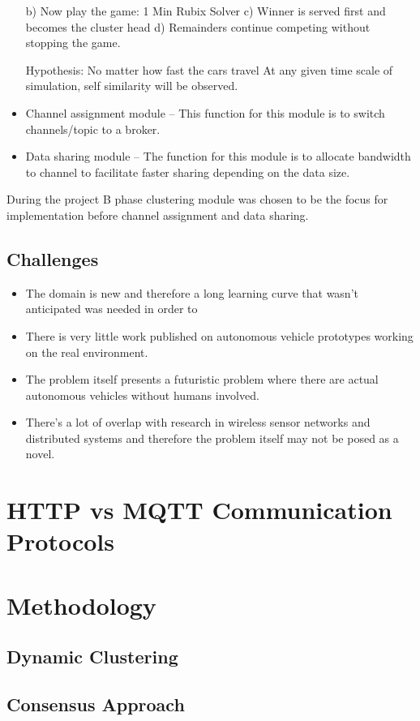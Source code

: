 \documentclass{article}
\begin{document}
\begin{itemize}
b) Now play the game: 1 Min Rubix Solver
c) Winner is served first and becomes the cluster head
d) Remainders continue competing without stopping the game.

Hypothesis: No matter how fast the cars travel At any given time scale of simulation, self similarity will be observed.

    \item Channel assignment module – This function for this module is to switch channels/topic to a broker.
    \item Data sharing module – The function for this module is to allocate bandwidth to channel to facilitate faster sharing depending on the data size.
\end{itemize}

During the project B phase clustering module was chosen to be the focus for implementation before channel assignment and data sharing.

\subsection{Challenges}
\begin{itemize}
\item The domain is new and therefore a long learning curve that wasn’t anticipated was needed in order to
\item There is very little work published on autonomous vehicle prototypes working on the real environment.
\item The problem itself presents a futuristic problem where there are actual autonomous vehicles without humans involved.
\item There’s a lot of overlap with research in wireless sensor networks and distributed systems and therefore the problem itself may not be posed as a novel.
\end{itemize}

\section{HTTP vs MQTT Communication Protocols}
\section{Methodology}
\subsection{Dynamic Clustering}
\subsection{Consensus Approach}
\end{document}
